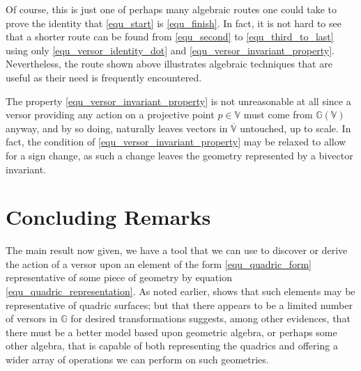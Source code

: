 \documentclass{birkjour}
\theoremstyle{definition}
\theoremstyle{remark}
\numberwithin{equation}{section}
\newcommand{\G}{\mathbb{G}}
\newcommand{\V}{\mathbb{V}}
\begin{document}
Of course, this is just one of perhaps many algebraic routes one could take to prove the
identity that \eqref{equ_start} is \eqref{equ_finish}.  In fact, it is not hard to see that
a shorter route can be found from \eqref{equ_second} to \eqref{equ_third_to_last} using only
\eqref{equ_versor_identity_dot} and \eqref{equ_versor_invariant_property}.  Nevertheless,
the route shown above illustrates algebraic techniques that are useful as their need is frequently encountered.

The property \eqref{equ_versor_invariant_property} is not unreasonable at all
since a versor providing any action on a projective point $p\in\V$ must come from $\G(\V)$ anyway,
and by so doing, naturally leaves vectors in $\overline{\V}$ untouched, up to scale.
In fact, the condition of \eqref{equ_versor_invariant_property} may be relaxed to allow
for a sign change, as such a change leaves the geometry represented by a bivector invariant.

\section{Concluding Remarks}

The main result now given, we have a tool that we can use to discover or derive the
action of a versor upon an element of the form \eqref{equ_quadric_form} representative of some piece of geometry
by equation \eqref{equ_quadric_representation}.  As noted earlier, \cite{Parkin12} shows that such elements may
be representative of quadric surfaces; but that there appears to be a limited number of
versors in $\G$ for desired transformations suggests, among other evidences, that there must
be a better model based upon geometric algebra, or perhaps some other algebra, that is capable of both representing the
quadrics and offering a wider array of operations we  can perform on such geometries.
\end{document}
